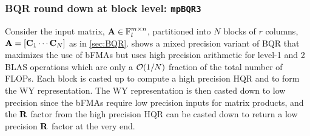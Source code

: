 \subsubsection{BQR round down at block level: {\tt mpBQR3}}\label{sec:mp-3b}
Consider the input matrix, $\mathbf{A}\in\mathbb{F}_l^{m\times n}$, partitioned into $N$ blocks of $r$ columns, $\mathbf{A}=[\mathbf{C}_1 \cdots \mathbf{C}_N]$ as in \cref{sec:BQR}.
 shows a mixed precision variant of BQR that maximizes the use of bFMAs but uses high precision arithmetic for level-1 and 2 BLAS operations which are only a $\mathcal{O}(1/N)$ fraction of the total number of FLOPs. 
Each block is casted up to compute a high precision HQR and to form the WY representation. 
The WY representation is then casted down to low precision since the bFMAs require low precision inputs for matrix products, and the $\mathbf{R}$ factor from the high precision HQR can be casted down to return a low precision $\mathbf{R}$ factor at the very end. 
